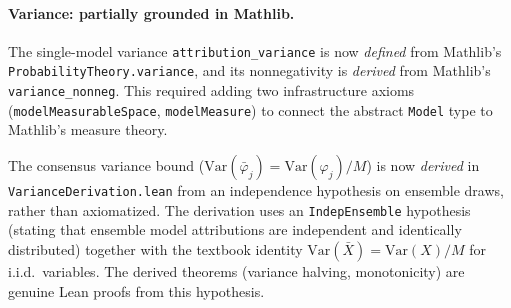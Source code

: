 \documentclass{article}
\newcommand{\Var}{\mathrm{Var}}
\begin{document}
\begin{sloppypar}
\paragraph{Variance: partially grounded in Mathlib.}
The single-model variance \texttt{attribution\_variance} is now
\emph{defined} from Mathlib's \texttt{ProbabilityTheory.variance},
and its nonnegativity is \emph{derived} from Mathlib's
\texttt{variance\_nonneg}. This required adding two infrastructure
axioms (\texttt{modelMeasurableSpace}, \texttt{modelMeasure}) to
connect the abstract \texttt{Model} type to Mathlib's measure theory.
\end{sloppypar}

The consensus variance bound ($\Var(\bar\varphi_j) = \Var(\varphi_j)/M$)
is now \emph{derived} in \texttt{VarianceDerivation.lean} from an
independence hypothesis on ensemble draws, rather than axiomatized.
The derivation uses an \texttt{IndepEnsemble} hypothesis (stating that
ensemble model attributions are independent and identically distributed)
together with the textbook identity $\Var(\bar{X}) = \Var(X)/M$
for i.i.d.\ variables. The derived theorems (variance halving,
monotonicity) are genuine Lean proofs from this hypothesis.
\end{document}
